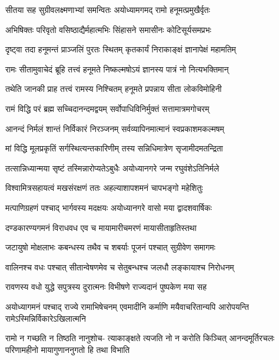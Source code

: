 \twolineshloka
{सीतया सह सुग्रीवलक्ष्मणाभ्यां समन्वितः}
{अयोध्यामगमद् रामो हनूमत्प्रमुखैर्वृतः} %

\twolineshloka
{अभिषिक्तः परिवृतो वसिष्ठाद्यैर्महात्मभिः}
{सिंहासने समासीनः कोटिसूर्यसमप्रभः} %

\twolineshloka
{दृष्ट्वा तदा हनूमन्तं प्राञ्जलिं पुरतः स्थितम्}
{कृतकार्यं निराकाङ्क्षं ज्ञानापेक्षं महामतिम्} %

\twolineshloka
{रामः सीतामुवाचेदं ब्रूहि तत्त्वं हनूमते}
{निष्कल्मषोऽयं ज्ञानस्य पात्रं नो नित्यभक्तिमान्} %

\twolineshloka
{तथेति जानकी प्राह तत्त्वं रामस्य निश्चितम्}
{हनूमते प्रपन्नाय सीता लोकविमोहिनी} %


\twolineshloka
{रामं विद्धि परं ब्रह्म सच्चिदानन्दमद्वयम्}
{सर्वोपाधिविनिर्मुक्तं सत्तामात्रमगोचरम्} %

\twolineshloka
{आनन्दं निर्मलं शान्तं निर्विकारं निरञ्जनम्}
{सर्वव्यापिनमात्मानं स्वप्रकाशमकल्मषम्} %

\twolineshloka
{मां विद्धि मूलप्रकृतिं सर्गस्थित्यन्तकारिणीम्}
{तस्य सन्निधिमात्रेण सृजामीदमतन्द्रिता} %

\twolineshloka
{तत्सान्निध्यान्मया सृष्टं तस्मिन्नारोप्यतेऽबुधैः}
{अयोध्यानगरे जन्म रघुवंशेऽतिनिर्मले} %

\twolineshloka
{विश्वामित्रसहायत्वं मखसंरक्षणं ततः}
{अहल्याशापशमनं चापभङ्गो महेशितुः} %

\twolineshloka
{मत्पाणिग्रहणं पश्चाद् भार्गवस्य मदक्षयः}
{अयोध्यानगरे वासो मया द्वादशवार्षिकः} %

\twolineshloka
{दण्डकारण्यगमनं विराधवध एव च}
{मायामारीचमरणं मायासीताहृतिस्तथा} %

\twolineshloka
{जटायुषो मोक्षलाभः कबन्धस्य तथैव च}
{शबर्याः पूजनं पश्चात् सुग्रीवेण समागमः} %

\twolineshloka
{वालिनश्च वधः पश्चात् सीतान्वेषणमेव च}
{सेतुबन्धश्च जलधौ लङ्कायाश्च निरोधनम्} %

\twolineshloka
{रावणस्य वधो युद्धे सपुत्रस्य दुरात्मनः}
{विभीषणे राज्यदानं पुष्पकेण मया सह} %

\threelineshloka
{अयोध्यागमनं पश्चाद् राज्ये रामाभिषेचनम्}
{एवमादीनि कर्माणि मयैवाचरितान्यपि}
{आरोपयन्ति रामेऽस्मिन्निर्विकारेऽखिलात्मनि} %

\fourlineindentedshloka
{रामो न गच्छति न तिष्ठति नानुशोच-}
{त्याकाङ्क्षते त्यजति नो न करोति किञ्चित्}
{आनन्दमूर्तिरचलः परिणामहीनो}
{मायागुणाननुगतो हि तथा विभाति} %

